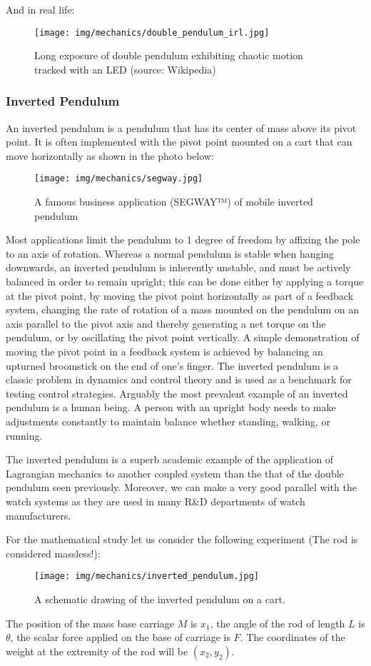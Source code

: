 	And in real life:
	\begin{figure}[H]
		\centering
		\texttt{[image: img/mechanics/double\_pendulum\_irl.jpg]}
		\caption{Long exposure of double pendulum exhibiting chaotic motion tracked with an LED (source: Wikipedia)}
	\end{figure}
	
	\pagebreak
	\subsubsection{Inverted Pendulum}
	An inverted pendulum is a pendulum that has its center of mass above its pivot point. It is often implemented with the pivot point mounted on a cart that can move horizontally as shown in the photo below:
	\begin{figure}[H]
		\centering
		\texttt{[image: img/mechanics/segway.jpg]}
		\caption{A famous business application (SEGWAY™) of mobile inverted pendulum}
	\end{figure}
	Most applications limit the pendulum to $1$ degree of freedom by affixing the pole to an axis of rotation. Whereas a normal pendulum is stable when hanging downwards, an inverted pendulum is inherently unstable, and must be actively balanced in order to remain upright; this can be done either by applying a torque at the pivot point, by moving the pivot point horizontally as part of a feedback system, changing the rate of rotation of a mass mounted on the pendulum on an axis parallel to the pivot axis and thereby generating a net torque on the pendulum, or by oscillating the pivot point vertically. A simple demonstration of moving the pivot point in a feedback system is achieved by balancing an upturned broomstick on the end of one's finger. The inverted pendulum is a classic problem in dynamics and control theory and is used as a benchmark for testing control strategies. Arguably the most prevalent example of an inverted pendulum is a human being. A person with an upright body needs to make adjustments constantly to maintain balance whether standing, walking, or running.
	
	The inverted pendulum is a superb academic example of the application of Lagrangian mechanics to another coupled system than the that of the double pendulum seen previously. Moreover, we can make a very good parallel with the watch systems as they are used in many R\&D departments of watch manufacturers.

	For the mathematical study let us consider the following experiment (The rod is considered massless!):
	\begin{figure}[H]
		\centering
		\texttt{[image: img/mechanics/inverted\_pendulum.jpg]}
		\caption{A schematic drawing of the inverted pendulum on a cart.}
	\end{figure}
	The position of the mass base carriage $M$ is $x_1$, the angle of the rod of length $L$ is $\theta$, the scalar force applied on the base of carriage is $F$. The coordinates of the weight at the extremity of the rod will be $(x_2,y_2)$.

